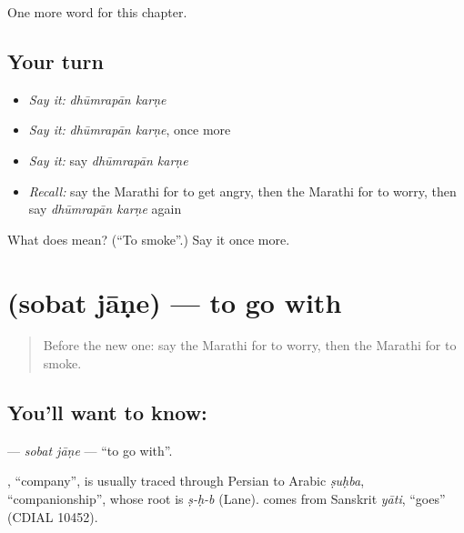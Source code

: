 \begin{grammarlens}[title={What you've built}]
One more word for this chapter.
\end{grammarlens}

\subsection*{Your turn}
\begin{itemize}
\raggedright
  \item \emph{Say it:} \emph{dhūmrapān karṇe}
  \item \emph{Say it:} \emph{dhūmrapān karṇe}, once more
  \item \emph{Say it:} say \emph{dhūmrapān karṇe}
  \item \emph{Recall:} say the Marathi for to get angry, then the Marathi for to worry, then say \emph{dhūmrapān karṇe} again
\end{itemize}

\begin{tcolorbox}[breakable,colback=teal!4,colframe=teal!35!black,title={Before you move on}]
What does   mean? (\textquotedblleft{}To smoke\textquotedblright{}.) Say it once more.
\end{tcolorbox}
\section[\texorpdfstring{\mr{सोबत} \mr{जाणे} (sobat jāṇe)}{सोबत जाणे (sobat jāṇe)}]{  (sobat jāṇe) — to go with}

\label{lesson:MR-C252-sobat-jane}



\begin{quote}
Before the new one: say the Marathi for to worry, then the Marathi for to smoke.
\end{quote}

\subsection*{You'll want to know:  }
\textbf{ } — \emph{sobat jāṇe} — \textquotedblleft{}to go with\textquotedblright{}.

\begin{cousinweb}
\textbf{}, \textquotedblleft{}company\textquotedblright{}, is usually traced through Persian to Arabic \emph{ṣuḥba}, \textquotedblleft{}companionship\textquotedblright{}, whose root is \emph{ṣ-ḥ-b} (Lane). \textbf{} comes from Sanskrit \emph{yāti}, \textquotedblleft{}goes\textquotedblright{} (CDIAL 10452).
\end{cousinweb}

